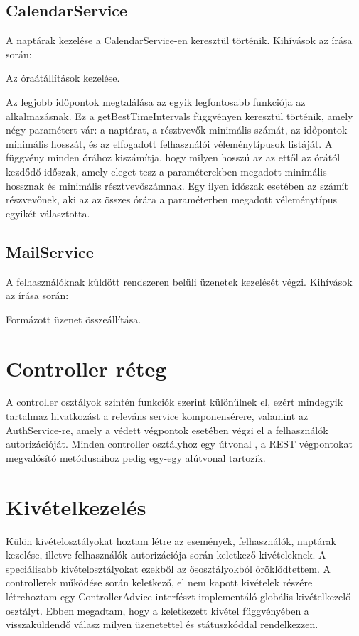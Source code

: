 \documentclass[a4paper,12pt]{report}
\theoremstyle{definition}
\theoremstyle{remark}
\begin{document}
\subsection{CalendarService}

A naptárak kezelése a CalendarService-en keresztül történik. Kihívások az írása során:

Az óraátállítások kezelése.

Az legjobb időpontok megtalálása az egyik legfontosabb funkciója az alkalmazásnak. Ez a getBestTimeIntervals függvényen keresztül történik, amely négy paramétert vár: a naptárat, a résztvevők minimális számát, az időpontok minimális hosszát, és az elfogadott felhasználói véleménytípusok listáját. A függvény minden órához kiszámítja, hogy milyen hosszú az az ettől az órától kezdődő időszak, amely eleget tesz a paraméterekben megadott minimális hossznak és minimális résztvevőszámnak. Egy ilyen időszak esetében az számít részvevőnek, aki az az összes órára a paraméterben megadott véleménytípus egyikét választotta.

\subsection{MailService}

A felhasználóknak küldött rendszeren belüli üzenetek kezelését végzi. Kihívások az írása során:

Formázott üzenet összeállítása.

\section{Controller réteg}

A controller osztályok szintén funkciók szerint különülnek el, ezért mindegyik tartalmaz hivatkozást a releváns service komponensérere, valamint az AuthService-re, amely a védett végpontok esetében végzi el a felhasználók autorizációját. Minden controller osztályhoz egy útvonal , a REST végpontokat megvalósító metódusaihoz pedig egy-egy alútvonal tartozik.

\section{Kivételkezelés}

Külön kivételosztályokat hoztam létre az események, felhasználók, naptárak kezelése, illetve felhasználók autorizációja során keletkező kivételeknek. A speciálisabb kivételosztályokat ezekből az ősosztályokból öröklődtettem. A controllerek működése során keletkező, el nem kapott kivételek részére létrehoztam egy ControllerAdvice interfészt implementáló globális kivételkezelő osztályt. Ebben megadtam, hogy a keletkezett kivétel függvényében a visszaküldendő válasz milyen üzenetettel és státuszkóddal rendelkezzen.
\end{document}
